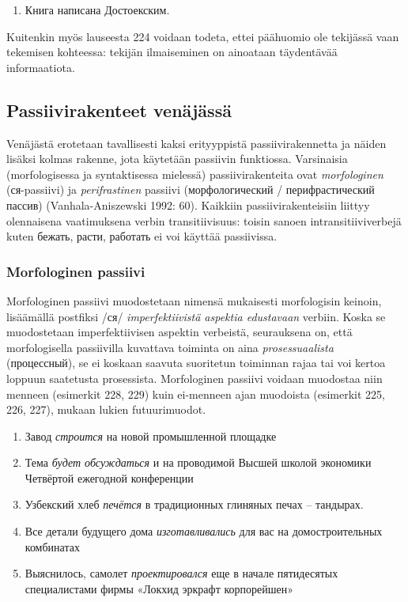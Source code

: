 \documentclass[]{scrartcl}
\providecommand{\tightlist}{%
  \setlength{\itemsep}{0pt}\setlength{\parskip}{0pt}}
\begin{document}
\begin{enumerate}
\def\labelenumi{(\arabic{enumi})}
\setcounter{enumi}{223}
\tightlist
\item
  Книга написана Достоекским.
\end{enumerate}

Kuitenkin myös lauseesta 224 voidaan todeta, ettei päähuomio ole
tekijässä vaan tekemisen kohteessa: tekijän ilmaiseminen on ainoataan
täydentävää informaatiota.

\subsection{Passiivirakenteet
venäjässä}\label{passiivirakenteet-venuxe4juxe4ssuxe4}

Venäjästä erotetaan tavallisesti kaksi erityyppistä passiivirakennetta
ja näiden lisäksi kolmas rakenne, jota käytetään passiivin funktiossa.
Varsinaisia (morfologisessa ja syntaktisessa mielessä)
passiivirakenteita ovat \emph{morfologinen} (ся-passiivi) ja
\emph{perifrastinen} passiivi (морфологический / перифрастический
пассив) (Vanhala-Aniszewski 1992: 60). Kaikkiin passiivirakenteisiin
liittyy olennaisena vaatimuksena verbin transitiivisuus: toisin sanoen
intransitiiviverbejä kuten бежать, расти, работать ei voi käyttää
passiivissa.

\subsubsection{Morfologinen passiivi}\label{morfologinen-passiivi}

Morfologinen passiivi muodostetaan nimensä mukaisesti morfologisin
keinoin, lisäämällä postfiksi /ся/ \emph{imperfektiivistä aspektia
edustavaan} verbiin. Koska se muodostetaan imperfektiivisen aspektin
verbeistä, seurauksena on, että morfologisella passiivilla kuvattava
toiminta on aina \emph{prosessuaalista} (процессный), se ei koskaan
saavuta suoritetun toiminnan rajaa tai voi kertoa loppuun saatetusta
prosessista. Morfologinen passiivi voidaan muodostaa niin menneen
(esimerkit 228, 229) kuin ei-menneen ajan muodoista (esimerkit 225, 226,
227), mukaan lukien futuurimuodot.

\begin{enumerate}
\def\labelenumi{(\arabic{enumi})}
\setcounter{enumi}{224}
\tightlist
\item
  Завод \emph{строится} на новой промышленной площадке
\item
  Тема \emph{будет обсуждаться} и на проводимой Высшей школой экономики
  Четвёртой ежегодной конференции
\item
  Узбекский хлеб \emph{печётся} в традиционных глиняных печах --
  тандырах.
\item
  Все детали будущего дома \emph{изготавливались} для вас на
  домостроительных комбинатах
\item
  Выяснилось, самолет \emph{проектировался} еще в начале пятидесятых
  специалистами фирмы «Локхид эркрафт корпорейшен»
\end{enumerate}
\end{document}
